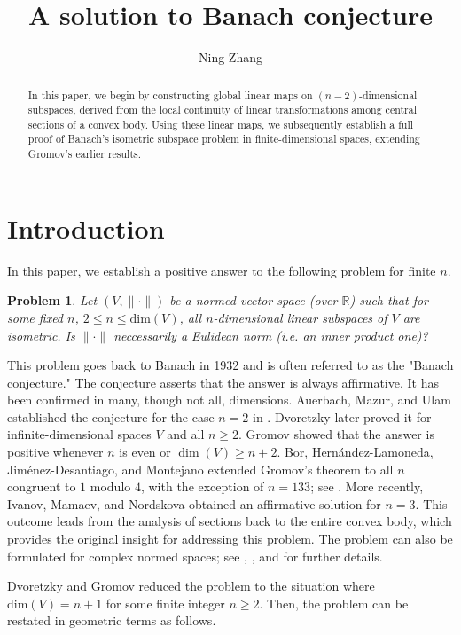 \documentclass[amsfonts,reqno,11pt]{amsart}
\title[A solution to Banach conjecture]{A solution to Banach conjecture}
\author{Ning Zhang}
\newtheorem{prob}{Problem}[section]
\newcommand{\R}{\mathbb{R}}
\begin{document}
\maketitle

\begin{abstract}
In this paper, we begin by constructing global linear maps on \((n-2)\)-dimensional subspaces, derived from the local continuity of linear transformations among central sections of a convex body. Using these linear maps, we subsequently establish a full proof of Banach’s isometric subspace problem in finite-dimensional spaces, extending Gromov’s earlier results.
\end{abstract}

\section{Introduction}
In this paper, we establish a positive answer to the following problem for finite $n$.
\begin{prob}
    Let $(V,\|\cdot\|)$ be a normed vector space (over $\R$) such that for some fixed $n$, $2\leq n\leq \mbox{dim}(V)$, all $n$-dimensional linear subspaces of $V$ are isometric. Is $\|\cdot\|$ neccessarily a Eulidean norm (i.e. an inner product one)?
\end{prob}

This problem goes back to Banach in 1932 \cite[Remarks on Chapter XII]{Banach1932} and is often referred to as the "Banach conjecture." The conjecture asserts that the answer is always affirmative. It has been confirmed in many, though not all, dimensions. Auerbach, Mazur, and Ulam established the conjecture for the case $n=2$ in \cite{AMU}. Dvoretzky \cite{Dvoretzky1959} later proved it for infinite-dimensional spaces $V$ and all $n\geq 2$. Gromov \cite{Gromov1967} showed that the answer is positive whenever $n$ is even or $\dim(V)\geq n+2$. Bor, Hern\'andez-Lamoneda, Jim\'enez-Desantiago, and Montejano extended Gromov’s theorem to all $n$ congruent to $1$ modulo $4$, with the exception of $n=133$; see \cite{BHJM2021}. More recently, Ivanov, Mamaev, and Nordskova \cite{IMN2023} obtained an affirmative solution for $n=3$. This outcome leads from the analysis of sections back to the entire convex body, which provides the original insight for addressing this problem. The problem can also be formulated for complex normed spaces; see \cite{BM2021}, \cite{Gromov1967}, and \cite{M1971} for further details.

Dvoretzky and Gromov reduced the problem to the situation where $\mbox{dim}(V)=n+1$ for some finite integer $n\geq 2$. Then, the problem can be restated in geometric terms as follows.
\end{document}
